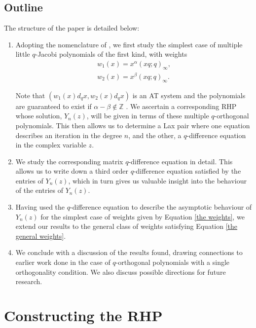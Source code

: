 \documentclass[a4paper,reqno]{amsart}
\numberwithin{equation}{section}
\numberwithin{figure}{section}
\begin{document}
\subsection{Outline}
The structure of the paper is detailed below:
\begin{enumerate}
    \item Adopting the nomenclature of  \cite{postelmans2005multiple}, we first study the simplest case of multiple little $q$-Jacobi polynomials of the first kind, with weights
    \begin{subequations}\label{the weights}
        \begin{eqnarray}
    w_1(x) = x^\alpha (xq;q)_\infty,\\
    w_2(x) = x^\beta (xq;q)_\infty.
\end{eqnarray}
    \end{subequations}

    Note that $(w_1(x)d_qx, w_2(x)d_qx)$ is an AT system and the polynomials are guaranteed to exist if $\alpha-\beta \notin \mathbb{Z}$ \cite[Chapter 23.6.5.1]{ismail2005classical}. We ascertain a corresponding RHP whose solution, $Y_n(z)$, will be given in terms of these multiple $q$-orthogonal polynomials. This then allows us to determine a Lax pair where one equation describes an iteration in the degree $n$, and the other, a $q$-difference equation in the complex variable $z$.
    \item We study the corresponding matrix $q$-difference equation in detail. This allows us to write down a third order $q$-difference equation satisfied by the entries of $Y_n(z)$, which in turn gives us valuable insight into the behaviour of the entries of $Y_n(z)$.
    \item Having used the $q$-difference equation to describe the asymptotic behaviour of $Y_n(z)$ for the simplest case of weights given by Equation \eqref{the weights}, we extend our results to the general class of weights satisfying Equation \eqref{the general weights}.
    \item We conclude with a discussion of the results found, drawing connections to earlier work done in the case of $q$-orthogonal polynomials with a single orthogonality condition. We also discuss possible directions for future research.
\end{enumerate}





\section{Constructing the RHP}
\end{document}
